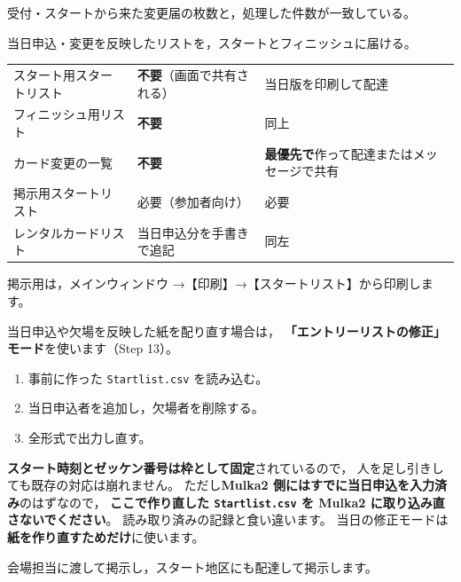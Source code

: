 \begin{Done}
受付・スタートから来た変更届の枚数と，処理した件数が一致している。
\end{Done}


\begin{Goal}
当日申込・変更を反映したリストを，スタートとフィニッシュに届ける。
\end{Goal}

\begin{center}
\small
\begin{tabular}{@{}P{40mm}P{50mm}P{54mm}@{}}
\toprule
 &  &  \\
\midrule
スタート用スタートリスト & \textbf{不要}（画面で共有される） & 当日版を印刷して配達 \\
フィニッシュ用リスト & \textbf{不要} & 同上 \\
カード変更の一覧 & \textbf{不要} & \textbf{最優先で}作って配達またはメッセージで共有 \\
掲示用スタートリスト & 必要（参加者向け） & 必要 \\
レンタルカードリスト & 当日申込分を手書きで追記 & 同左 \\
\bottomrule
\end{tabular}
\end{center}

掲示用は，メインウィンドウ →【印刷】→【スタートリスト】から印刷します。

\begin{J2M}
当日申込や欠場を反映した紙を配り直す場合は，
\textbf{「エントリーリストの修正」モード}を使います（Step 13）。

\begin{enumerate}
\item 事前に作った \texttt{Startlist.csv} を読み込む。
\item 当日申込者を追加し，欠場者を削除する。
\item 全形式で出力し直す。
\end{enumerate}

\textbf{スタート時刻とゼッケン番号は枠として固定}されているので，
人を足し引きしても既存の対応は崩れません。
ただし\textbf{Mulka2 側にはすでに当日申込を入力済み}のはずなので，
\textbf{ここで作り直した \texttt{Startlist.csv} を Mulka2 に取り込み直さないでください}。
読み取り済みの記録と食い違います。
当日の修正モードは\textbf{紙を作り直すためだけ}に使います。
\end{J2M}
会場担当に渡して掲示し，スタート地区にも配達して掲示します。

